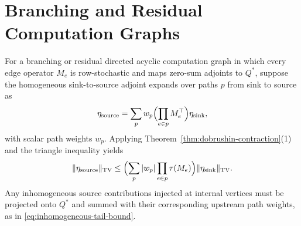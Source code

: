 \documentclass[10pt]{article}
\newcommand{\TV}{\mathrm{TV}}
\begin{document}
\section{Branching and Residual Computation Graphs}
\label{app:dag-remark}

For a branching or residual directed acyclic computation graph in which every edge operator $M_e$ is row-stochastic and maps zero-sum adjoints to $Q^*$, suppose the homogeneous sink-to-source adjoint expands over paths $p$ from sink to source as
\[
  \eta_{\mathrm{source}} = \sum_p w_p \Bigl(\prod_{e \in p} M_e^\top\Bigr)\eta_{\mathrm{sink}},
\]
with scalar path weights $w_p$. Applying Theorem~\ref{thm:dobrushin-contraction}(1) and the triangle inequality yields
\[
  \|\eta_{\mathrm{source}}\|_{\TV}
  \le \Bigl(\sum_p |w_p| \prod_{e \in p} \tau(M_e)\Bigr)\|\eta_{\mathrm{sink}}\|_{\TV}.
\]
Any inhomogeneous source contributions injected at internal vertices must be projected onto $Q^*$ and summed with their corresponding upstream path weights, as in \eqref{eq:inhomogeneous-tail-bound}.



\end{document}
